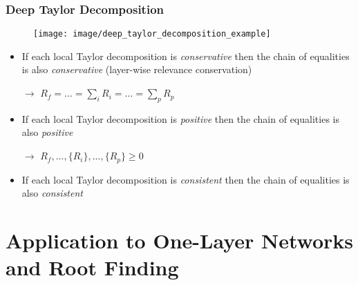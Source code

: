 \documentclass{beamer}
\begin{document}
\begin{frame}
\frametitle{Deep Taylor Decomposition}
\vspace{0.25cm}
\begin{figure}
\texttt{[image: image/deep\_taylor\_decomposition\_example]}
 \end{figure}

\begin{itemize}
\item  If each local Taylor decomposition is \textit{conservative} then the chain of equalities is also \textit{conservative} (layer-wise relevance conservation)
\item[$\rightarrow$] $R_f = ...= \sum_i R_i = ... = \sum_p R_p$
\item  If each local Taylor decomposition is \textit{positive} then the chain of equalities is also \textit{positive} 
\item[$\rightarrow$] $R_f,...,\{R_i\},...,\{R_p\} \geq 0$
\item If each local Taylor decomposition is \textit{consistent} then the chain of equalities is also \textit{consistent} 
\end{itemize}


\end{frame}

\section[One-Layer Networks]{Application to One-Layer Networks and Root Finding}
\end{document}
